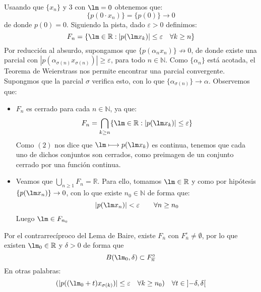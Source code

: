 \begin{ejercicio}
    \noindent
    Usaando que $\{x_n\}$ y 3 con $\lm = 0$ obtenemos que: %
    \begin{equation*}
        \{p(0\cdot x_n)\} = \{p(0)\} \to 0
    \end{equation*}
    de donde $p(0) = 0$. Siguiendo la pista, dado $\varepsilon>0$ definimos:
    \begin{equation*}
        F_n = \{\lm \in \mathbb{R} : |p(\lm x_k)| \leq \varepsilon\quad \forall k\geq n\}
    \end{equation*}
    Por reducción al absurdo, supongamos que $\{p(\alpha_n x_n)\}\not\to 0$, de donde existe una parcial con $|p(\alpha_{\sigma(n)}x_{\sigma(n)})|\geq \varepsilon$, para todo $n\in \mathbb{N}$. Como $\{\alpha_n\}$ está acotada, el Teorema de Weierstrass nos permite encontrar una parcial convergente. Supongmos que la parcial $\sigma$ verifica esto, con lo que $\{\alpha_{\sigma(n)}\}\to \alpha$. Observemos que:
    \begin{itemize}
        \item $F_n$ es cerrado para cada $n\in \mathbb{N}$, ya que:
            \begin{equation*}
                F_n = \bigcap_{k\geq n}\{\lm \in \mathbb{R} : |p(\lm x_k)|\leq \varepsilon\}
            \end{equation*}
            Como $(2)$ nos dice que $\lm \longmapsto p(\lm x_k)$ es continua, tenemos que cada uno de dichos conjuntos son cerrados, como preimagen de un conjunto cerrado por una función continua.
        \item Veamos que $\bigcup_{n\geq 1}F_n = \mathbb{R}$. Para ello, tomamos $\lm \in \mathbb{R}$ y como por hipótesis $\{p(\lm x_n)\}\to 0$, con lo que existe $n_0\in \mathbb{N}$ de forma que:
            \begin{equation*}
                |p(\lm x_n)| < \varepsilon \qquad \forall n\geq n_0
            \end{equation*}
            Luego $\lm\in  F_{n_0}$
    \end{itemize}
    Por el contrarrecíproco del Lema de Baire, existe $F_{\overline{n}}$ con $F_{\overline{n}}^\circ \neq \emptyset $, por lo que existen $\lm_0 \in \mathbb{R}$ y $\delta>0$ de forma que
    \begin{equation*}
        B(\lm_0, \delta)\subset F_{\overline{n}}^\circ
    \end{equation*}
    En otras palabras:
    \begin{equation*}
        (|p((\lm_0+t)x_{\sigma(k)})| \leq \varepsilon\quad \forall k\geq n_0 ) \quad \forall t\in \left]-\delta,\delta\right[

\end{equation*}
\end{ejercicio}
